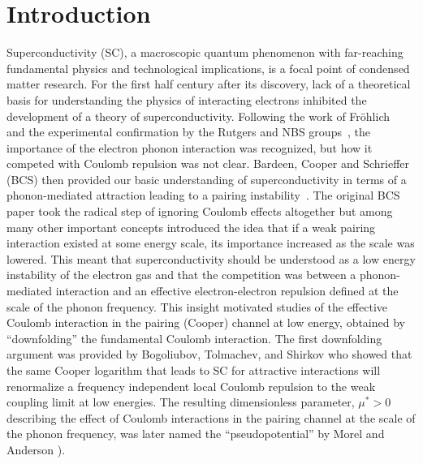 \documentclass[%
 reprint,
superscriptaddress,
 amsmath,amssymb,
 aps,
prx,
]{revtex4-2}
\begin{document}
\maketitle


\section{Introduction}

Superconductivity (SC), a macroscopic quantum phenomenon with far-reaching fundamental physics and technological implications, is a focal point of condensed matter research. 
For the first half century after its discovery, lack of a theoretical basis for understanding the physics of interacting electrons inhibited the development of a theory of superconductivity. 
Following the work of Fröhlich~\cite{frohlich1950} and the experimental confirmation by the Rutgers and NBS groups~\cite{reynolds1950,maxwell1950},
the importance of the electron phonon interaction was recognized, but how it competed with Coulomb repulsion was not clear. Bardeen, Cooper and Schrieffer (BCS) then provided our basic understanding of superconductivity in terms of a phonon-mediated attraction leading to a pairing instability~\cite{cooper_bound_1956-1,bardeen_theory_1957,bardeen_microscopic_1957}. 
The original BCS paper took the radical step of ignoring Coulomb effects altogether but among many other important concepts introduced the idea that if a weak pairing interaction existed at some energy scale, its importance increased as the scale was lowered.  This meant that superconductivity should be understood as a low energy instability of the electron gas and that the competition was between a phonon-mediated interaction and an effective electron-electron repulsion defined at the scale of the phonon frequency.  This insight  motivated studies of the effective Coulomb interaction in the pairing (Cooper) channel at low energy, obtained by ``downfolding'' the fundamental Coulomb interaction. The first downfolding argument was provided by Bogoliubov, Tolmachev, and Shirkov \cite{bogoliubov59,tolmachev1961logarithmic} who showed that the same Cooper logarithm that leads to SC for attractive interactions will renormalize a frequency independent local Coulomb repulsion to the weak coupling limit at low energies.  The resulting dimensionless parameter, $\mu^* > 0$ describing the effect of Coulomb interactions in the pairing channel at the scale of the phonon frequency, was later named the ``pseudopotential'' by Morel and Anderson \cite{morel_anderson}). 
\end{document}
